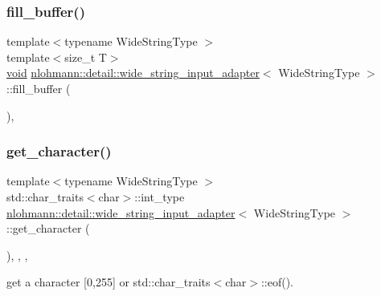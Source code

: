 \subsubsection{\texorpdfstring{fill\_buffer()}{fill\_buffer()}}
{\footnotesize\ttfamily template$<$typename Wide\+String\+Type $>$ \\
template$<$size\+\_\+t T$>$ \\
\mbox{\hyperlink{namespacenlohmann_1_1detail_a59fca69799f6b9e366710cb9043aa77d}{void}} \mbox{\hyperlink{classnlohmann_1_1detail_1_1wide__string__input__adapter}{nlohmann\+::detail\+::wide\+\_\+string\+\_\+input\+\_\+adapter}}$<$ Wide\+String\+Type $>$\+::fill\+\_\+buffer (\begin{DoxyParamCaption}{ }\end{DoxyParamCaption})\hspace{0.3cm}{\ttfamily [inline]}, {\ttfamily [private]}}

\mbox{\label{classnlohmann_1_1detail_1_1wide__string__input__adapter_abb62b34cf77e557ce5321b7f2490c3b0}} 
\subsubsection{\texorpdfstring{get\_character()}{get\_character()}}
{\footnotesize\ttfamily template$<$typename Wide\+String\+Type $>$ \\
std\+::char\+\_\+traits$<$char$>$\+::int\+\_\+type \mbox{\hyperlink{classnlohmann_1_1detail_1_1wide__string__input__adapter}{nlohmann\+::detail\+::wide\+\_\+string\+\_\+input\+\_\+adapter}}$<$ Wide\+String\+Type $>$\+::get\+\_\+character (\begin{DoxyParamCaption}{ }\end{DoxyParamCaption})\hspace{0.3cm}{\ttfamily [inline]}, {\ttfamily [override]}, {\ttfamily [virtual]}, {\ttfamily [noexcept]}}



get a character \mbox{[}0,255\mbox{]} or std\+::char\+\_\+traits$<$char$>$\+::eof(). 



